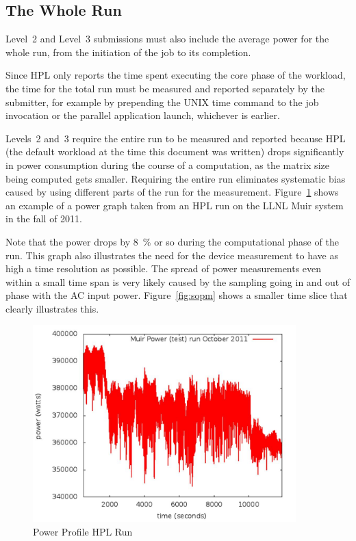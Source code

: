 \subsection{The Whole Run}

Level~2 and Level~3 submissions must also include the average power for the whole run, from the initiation of the job to its completion.

Since HPL only reports the time spent executing the core phase of the workload, the time for the total run must be measured and reported separately by the submitter, for example by prepending the UNIX time command to the job invocation or the parallel application launch, whichever is earlier.

Levels~2 and~3 require the entire run to be measured and reported because HPL (the default workload at the time this document was written) drops significantly in power consumption during the course of a computation, as the matrix size being computed gets smaller.
Requiring the entire run eliminates systematic bias caused by using different parts of the run for the measurement.
Figure~\ref{fig:powprof} shows an example of a power graph taken from an HPL run on the LLNL Muir system in the fall of 2011.

Note that the power drops by \SI{8}{\percent} or so during the computational phase of the run.
This graph also illustrates the need for the device measurement to have as high a time resolution as possible.
The spread of power measurements even within a small time span is very likely caused by the sampling going in and out of phase with the AC input power.
Figure~\ref{fig:sopm} shows a smaller time slice that clearly illustrates this.


\begin{figure}
\centering
\includegraphics[width=4in]{fig3-1}
\caption{Power Profile HPL Run}
\label{fig:powprof}
\end{figure}

